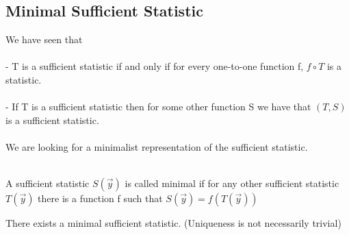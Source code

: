 \documentclass[../main.tex]{subfiles}
\begin{document}
\subsection{Minimal Sufficient Statistic}
We have seen that \\\\
- T is a sufficient statistic if and only if for every one-to-one function f, $f\circ T$ is a statistic.  \\\\
- If T is a sufficient statistic then for some other function S we have that $(T,S)$ is a sufficient statistic. \\\\
We are looking for a minimalist representation of the sufficient statistic. \\\\
\begin{definition} A sufficient statistic $S(\overrightarrow{y})$ is called minimal if for any other sufficient statistic $T(\overrightarrow{y})$ there is a function f such that $S(\overrightarrow{y}) = f(T(\overrightarrow{y}))$\end{definition}
\begin{theorem} There exists a minimal sufficient statistic. (Uniqueness is not necessarily trivial)\end{theorem}
\end{document}
